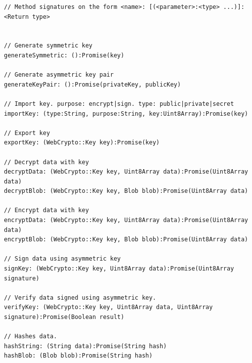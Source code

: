 \begin{Code}
\begin{lstlisting}[caption={Public methods of \texttt{RymdCrypto}}, label={lst:cryptointerface}]
// Method signatures on the form <name>: [(<parameter>:<type> ...)]:<Return type>


// Generate symmetric key 
generateSymmetric: ():Promise(key)

// Generate asymmetric key pair 
generateKeyPair: ():Promise(privateKey, publicKey)

// Import key. purpose: encrypt|sign. type: public|private|secret
importKey: (type:String, purpose:String, key:Uint8Array):Promise(key)

// Export key
exportKey: (WebCrypto::Key key):Promise(key)

// Decrypt data with key
decryptData: (WebCrypto::Key key, Uint8Array data):Promise(Uint8Array data)
decryptBlob: (WebCrypto::Key key, Blob blob):Promise(Uint8Array data)

// Encrypt data with key
encryptData: (WebCrypto::Key key, Uint8Array data):Promise(Uint8Array data) 
encryptBlob: (WebCrypto::Key key, Blob blob):Promise(Uint8Array data) 

// Sign data using asymmetric key
signKey: (WebCrypto::Key key, Uint8Array data):Promise(Uint8Array signature)

// Verify data signed using asymmetric key.
verifyKey: (WebCrypto::Key key, Uint8Array data, Uint8Array signature):Promise(Boolean result)

// Hashes data.
hashString: (String data):Promise(String hash)
hashBlob: (Blob blob):Promise(String hash)


\end{lstlisting}
\end{Code}


